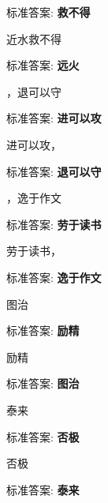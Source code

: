 \documentclass[12pt, a4paper, addpoints]{exam}
\begin{document}
\begin{multicols}{2}
\begin{questions}
标准答案: \textbf{救不得}

\question[1] 近水救不得\uline{\qquad\qquad\qquad}

标准答案: \textbf{远火}

\question[1] \uline{\qquad\qquad\qquad}，退可以守

标准答案: \textbf{进可以攻}

\question[1] 进可以攻，\uline{\qquad\qquad\qquad}

标准答案: \textbf{退可以守}

\question[1] \uline{\qquad\qquad\qquad}，逸于作文

标准答案: \textbf{劳于读书}

\question[1] 劳于读书，\uline{\qquad\qquad\qquad}

标准答案: \textbf{逸于作文}

\question[1] \uline{\qquad\qquad\qquad}图治

标准答案: \textbf{励精}

\question[1] 励精\uline{\qquad\qquad\qquad}

标准答案: \textbf{图治}

\question[1] \uline{\qquad\qquad\qquad}泰来

标准答案: \textbf{否极}

\question[1] 否极\uline{\qquad\qquad\qquad}

标准答案: \textbf{泰来}

\end{questions}
\end{multicols}
\end{document}
